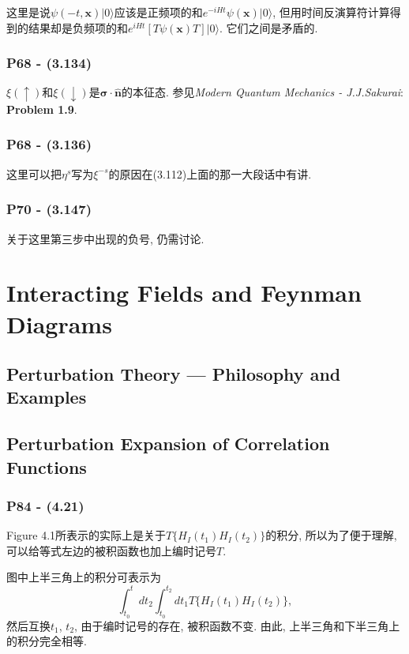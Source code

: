 \documentclass[cn,hazy,blue,11pt,device=normal,chinesefont=founder]{elegantnote}
\begin{document}
这里是说$\psi(-t, \mathbf{x})|0\rangle$应该是正频项的和$e^{-iHt}\psi(\mathbf{x})|0\rangle$, 但用时间反演算符计算得到的结果却是负频项的和$e^{iHt}[T\psi(\mathbf{x})T]|0\rangle$. 它们之间是矛盾的. 

\subsubsection{P68 - (3.134)}

$\xi(\uparrow)$和$\xi(\downarrow)$是$\boldsymbol{\sigma}\cdot\mathbf{\hat{n}}$的本征态. 参见\textit{Modern Quantum Mechanics - J.J.Sakurai}: \textbf{Problem 1.9}. 

\subsubsection{P68 - (3.136)}

这里可以把$\eta^s$写为$\xi^{-s}$的原因在(3.112)上面的那一大段话中有讲.

\subsubsection{P70 - (3.147)}

关于这里第三步中出现的负号, 仍需讨论. 

\clearpage

\section{Interacting Fields and Feynman Diagrams}

\subsection{Perturbation Theory --- Philosophy and Examples}

\subsection{Perturbation Expansion of Correlation Functions}

\subsubsection{P84 - (4.21)}

Figure 4.1所表示的实际上是关于$T\{H_I(t_1) H_I(t_2)\}$的积分, 所以为了便于理解, 可以给等式左边的被积函数也加上编时记号$T$. 

图中上半三角上的积分可表示为
\begin{equation}
  \int_{t_0}^{t} dt_2 \int_{t_0}^{t_2} dt_1 T\{H_I(t_1) H_I(t_2)\}, 
\end{equation}
然后互换$t_1$, $t_2$, 由于编时记号的存在, 被积函数不变. 由此, 上半三角和下半三角上的积分完全相等. 
\end{document}
